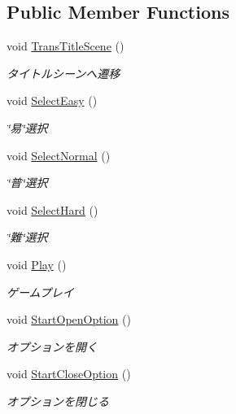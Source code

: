 \subsection*{Public Member Functions}
\begin{DoxyCompactItemize}
\item 
void \hyperlink{class_song_select_scene_controller_acb99166110cfceb7b53d679e1b4c16c2}{Trans\+Title\+Scene} ()
\begin{DoxyCompactList}\small\item\em タイトルシーンへ遷移 \end{DoxyCompactList}\item 
void \hyperlink{class_song_select_scene_controller_a2dcb0fe8a6c4196d78ed72800f3e8002}{Select\+Easy} ()
\begin{DoxyCompactList}\small\item\em \char`\"{}易\char`\"{}選択 \end{DoxyCompactList}\item 
void \hyperlink{class_song_select_scene_controller_a2e985edd5a3eea1aff475672a73b9c92}{Select\+Normal} ()
\begin{DoxyCompactList}\small\item\em \char`\"{}普\char`\"{}選択 \end{DoxyCompactList}\item 
void \hyperlink{class_song_select_scene_controller_ac066361fea8a0bf076e5d6e1859552ba}{Select\+Hard} ()
\begin{DoxyCompactList}\small\item\em \char`\"{}難\char`\"{}選択 \end{DoxyCompactList}\item 
void \hyperlink{class_song_select_scene_controller_ac5375256b9e14575e4a2908d87e3e5d3}{Play} ()
\begin{DoxyCompactList}\small\item\em ゲームプレイ \end{DoxyCompactList}\item 
void \hyperlink{class_song_select_scene_controller_ac7ac17097083308091146568ac0cdefa}{Start\+Open\+Option} ()
\begin{DoxyCompactList}\small\item\em オプションを開く \end{DoxyCompactList}\item 
void \hyperlink{class_song_select_scene_controller_a82e77f9bc2397d91fa82b2e8c200b187}{Start\+Close\+Option} ()
\begin{DoxyCompactList}\small\item\em オプションを閉じる \end{DoxyCompactList}\end{DoxyCompactItemize}


